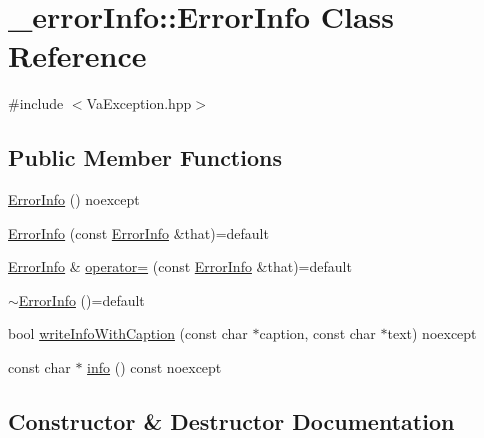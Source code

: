 \hypertarget{class__error_info_1_1_error_info}{}\section{\+\_\+error\+Info\+:\+:Error\+Info Class Reference}
\label{class__error_info_1_1_error_info}


{\ttfamily \#include $<$Va\+Exception.\+hpp$>$}

\subsection*{Public Member Functions}
\begin{DoxyCompactItemize}
\item 
\hyperlink{class__error_info_1_1_error_info_aa4064df25e992bc66893a180b3cd1f1d}{Error\+Info} () noexcept
\item 
\hyperlink{class__error_info_1_1_error_info_a57c4cfb8c202a30af070c352bc90a5f1}{Error\+Info} (const \hyperlink{class__error_info_1_1_error_info}{Error\+Info} \&that)=default
\item 
\hyperlink{class__error_info_1_1_error_info}{Error\+Info} \& \hyperlink{class__error_info_1_1_error_info_a98754d38c3be6eec3929baeeface533b}{operator=} (const \hyperlink{class__error_info_1_1_error_info}{Error\+Info} \&that)=default
\item 
\hyperlink{class__error_info_1_1_error_info_ae5cc27034a8b4af224b904f8c4e9bbdc}{$\sim$\+Error\+Info} ()=default
\item 
bool \hyperlink{class__error_info_1_1_error_info_a1ff0660e19c5db8082642e3f89e775ea}{write\+Info\+With\+Caption} (const char $\ast$caption, const char $\ast$text) noexcept
\item 
const char $\ast$ \hyperlink{class__error_info_1_1_error_info_a75f569b7baadfd54c8ac8ce4cc8a1e86}{info} () const noexcept
\end{DoxyCompactItemize}


\subsection{Constructor \& Destructor Documentation}
\mbox{\label{class__error_info_1_1_error_info_aa4064df25e992bc66893a180b3cd1f1d}} 
